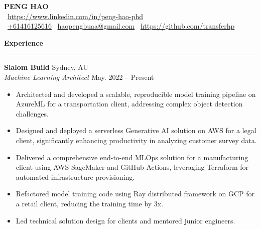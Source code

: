 \documentclass[a4paper,10pt]{article}
\begin{document}
\begin{center}
    {\LARGE \textbf{PENG HAO}} \\

    \faHome\ \href{https://www.linkedin.com/in/peng-hao-phd}{https://www.linkedin.com/in/peng-hao-phd} \\[1em]

    \faPhone\ \href{tel:+61416125616}{+61416125616} 
    \quad  %
    \faEnvelope\ \href{mailto:haopengbuaa@gmail.com}{haopengbuaa@gmail.com}
    \quad %
    \faGithub\ \href{https://github.com/transferhp}{https://github.com/transferhp}
\end{center}

\vspace{0.5em}

\begin{center}
    \textbf{\large Experience} \\
    \rule{\textwidth}{0.1pt}
\end{center}

\noindent
\textbf{Slalom Build} \hfill Sydney, AU \\
\textit{Machine Learning Architect} \hfill May. 2022 – Present \\
\begin{itemize}[leftmargin=0.15in, itemsep=1pt]
    \item Architected and developed a scalable, reproducible model training pipeline on AzureML for a transportation client, addressing complex object detection challenges.
    \item Designed and deployed a serverless Generative AI solution on AWS for a legal client, significantly enhancing productivity in analyzing customer survey data.
    \item Delivered a comprehensive end-to-end MLOps solution for a manufacturing client using AWS SageMaker and GitHub Actions, leveraging Terraform for automated infrastructure provisioning.
    \item Refactored model training code using Ray distributed framework on GCP for a retail client, reducing the training time by 3x.
    \item Led technical solution design for clients and mentored junior engineers.
\end{itemize}

\vspace{0.5em}
\end{document}
